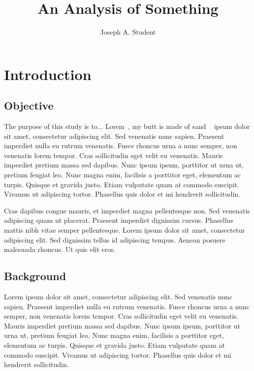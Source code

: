 \documentclass[double,12pt]{beavtex}
\title{An Analysis of Something}
\author{Joseph A. Student}
\begin{document}
\maketitle
\mainmatter


\chapter{Introduction}

\section{Objective}


The purpose of this study is to... Lorem~\citep{bockheimNutrientDynamicsDecomposing2011}, my butt is made of sand ~\citep{munsonNuCMCodeVersion1992} ipsum dolor sit amet, consectetur adipiscing elit. Sed venenatis nunc sapien. Praesent imperdiet nulla eu rutrum venenatis. Fusce rhoncus urna a nunc semper, non venenatis lorem tempor. Cras sollicitudin eget velit eu venenatis. Mauris imperdiet pretium massa sed dapibus. Nunc ipsum ipsum, porttitor ut urna ut, pretium feugiat leo. Nunc magna enim, facilisis a porttitor eget, elementum ac turpis. Quisque et gravida justo. Etiam vulputate quam at commodo suscipit. Vivamus ut adipiscing tortor. Phasellus quis dolor et mi hendrerit sollicitudin. 

Cras dapibus congue mauris, et imperdiet magna pellentesque non. Sed venenatis adipiscing quam ut placerat. Praesent imperdiet dignissim cursus. Phasellus mattis nibh vitae semper pellentesque. Lorem ipsum dolor sit amet, consectetur adipiscing elit. Sed dignissim tellus id adipiscing tempus. Aenean posuere malesuada rhoncus. Ut quis elit eros.


\section{Background}

Lorem ipsum dolor sit amet, consectetur adipiscing elit. Sed venenatis nunc sapien. Praesent imperdiet nulla eu rutrum venenatis. Fusce rhoncus urna a nunc semper, non venenatis lorem tempor. Cras sollicitudin eget velit eu venenatis. Mauris imperdiet pretium massa sed dapibus. Nunc ipsum ipsum, porttitor ut urna ut, pretium feugiat leo. Nunc magna enim, facilisis a porttitor eget, elementum ac turpis. Quisque et gravida justo. Etiam vulputate quam at commodo suscipit. Vivamus ut adipiscing tortor. Phasellus quis dolor et mi hendrerit sollicitudin. 
\end{document}
